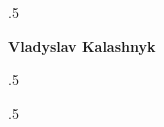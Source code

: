 

\moveleft.5\hoffset\centerline{\Large\bf Vladyslav Kalashnyk} %
 
\moveleft.5\hoffset\centerline{\bf \href{mailto:\email}{\email}} 
\moveleft.5\hoffset\centerline{\bf \href{\LinkedIn}{\LinkedIn}}

